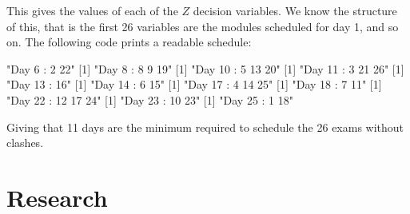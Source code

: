 This gives the values of each of the $Z$ decision variables.
We know the structure of this, that is the first 26 variables are the modules scheduled for day 1, and so on.
The following code prints a readable schedule:


\begin{Rout}
[1] "Day 6 : 2 22"
[1] "Day 8 : 8 9 19"
[1] "Day 10 : 5 13 20"
[1] "Day 11 : 3 21 26"
[1] "Day 13 : 16"
[1] "Day 14 : 6 15"
[1] "Day 17 : 4 14 25"
[1] "Day 18 : 7 11"
[1] "Day 22 : 12 17 24"
[1] "Day 23 : 10 23"
[1] "Day 25 : 1 18"
\end{Rout}

Giving that 11 days are the minimum required to schedule the 26 exams without clashes.

\section{Research}\label{sec:research}
